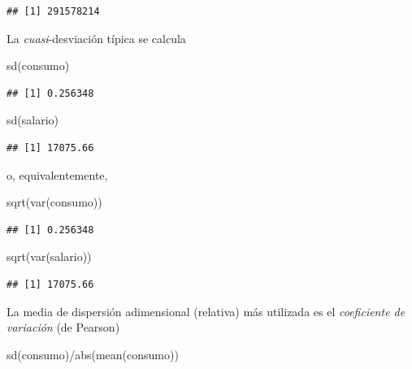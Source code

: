 \documentclass[
]{book}
\newenvironment{Shaded}{\begin{snugshade}}{\end{snugshade}}
\newcommand{\FunctionTok}[1]{\textcolor[rgb]{0.00,0.00,0.00}{#1}}
\newcommand{\NormalTok}[1]{#1}
\newcommand{\SpecialCharTok}[1]{\textcolor[rgb]{0.00,0.00,0.00}{#1}}
\theoremstyle{break}
\theoremstyle{nonumberplain}
\begin{document}
\begin{verbatim}
## [1] 291578214
\end{verbatim}

La \emph{cuasi}-desviación típica se calcula

\begin{Shaded}
\begin{Highlighting}[]
\FunctionTok{sd}\NormalTok{(consumo)}
\end{Highlighting}
\end{Shaded}

\begin{verbatim}
## [1] 0.256348
\end{verbatim}

\begin{Shaded}
\begin{Highlighting}[]
\FunctionTok{sd}\NormalTok{(salario)}
\end{Highlighting}
\end{Shaded}

\begin{verbatim}
## [1] 17075.66
\end{verbatim}

o, equivalentemente,

\begin{Shaded}
\begin{Highlighting}[]
\FunctionTok{sqrt}\NormalTok{(}\FunctionTok{var}\NormalTok{(consumo))}
\end{Highlighting}
\end{Shaded}

\begin{verbatim}
## [1] 0.256348
\end{verbatim}

\begin{Shaded}
\begin{Highlighting}[]
\FunctionTok{sqrt}\NormalTok{(}\FunctionTok{var}\NormalTok{(salario))}
\end{Highlighting}
\end{Shaded}

\begin{verbatim}
## [1] 17075.66
\end{verbatim}

La media de dispersión adimensional (relativa) más utilizada
es el \emph{coeficiente de variación} (de Pearson)

\begin{Shaded}
\begin{Highlighting}[]
\FunctionTok{sd}\NormalTok{(consumo)}\SpecialCharTok{/}\FunctionTok{abs}\NormalTok{(}\FunctionTok{mean}\NormalTok{(consumo))}
\end{Highlighting}
\end{Shaded}
\end{document}
